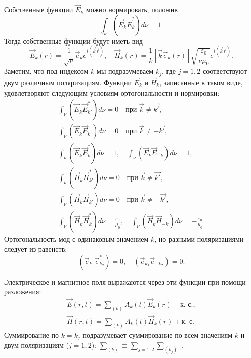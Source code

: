 Собственные функции $\vec{E}_k$ можно нормировать, положив
\begin{equation}
\int_{\nu} \left( \vec{E}_k \vec{E}_{k}^{*} \right) d \nu = 1.
\end{equation}
Тогда собственные функции будут иметь вид
\[
\vec{E}_k\left(r\right) = \frac{1}{\sqrt{\nu}}\vec{e}_k e^{i \left( \vec{k}\vec{r}\right)},
\quad
\vec{H}_k\left(r\right) = 
\frac{1}{k}
\left[\vec{k}\vec{e}_k\left(r\right)\right] 
\sqrt{\frac{\varepsilon_0}{\nu \mu_0}}
e^{i \left( \vec{k}\vec{r}\right)}.
\]
Заметим, что под индексом $k$  мы подразумеваем $k_j$,  где  $j = 1,
2$  соответствуют двум различным поляризациям.  
Функции  $\vec{E}_k$  и  $\vec{H}_k$,  записанные в таком виде,
удовлетворяют следующим условиям ортогональности и нормировки: 
\begin{eqnarray}
\int_{\nu} \left( \vec{E}_k \vec{E}_{k'}^{*} \right) d \nu = 0
\quad
\mbox{при } \vec{k} \ne \vec{k'},
\nonumber \\
\int_{\nu} \left( \vec{E}_k \vec{E}_{k'} \right) d \nu = 0
\quad
\mbox{при } \vec{k} \ne - \vec{k'},
\nonumber \\
\int_{\nu} \left( \vec{E}_k \vec{E}_{k}^{*} \right) d \nu = 1,
\quad
\int_{\nu} \left( \vec{E}_k \vec{E}_{-k} \right) d \nu = 1,
\nonumber \\
\int_{\nu} \left( \vec{H}_k \vec{H}_{k'}^{*} \right) d \nu = 0
\quad
\mbox{при } \vec{k} \ne \vec{k'},
\nonumber \\
\int_{\nu} \left( \vec{H}_k \vec{H}_{k'} \right) d \nu = 0
\quad
\mbox{при } \vec{k} \ne - \vec{k'},
\nonumber \\
\int_{\nu} \left( \vec{H}_k \vec{H}_{k}^{*} \right) d \nu = \frac{\varepsilon_0}{\mu_0},
\quad
\int_{\nu} \left( \vec{H}_k \vec{H}_{-k} \right) d \nu = - \frac{\varepsilon_0}{\mu_0}.
\label{eqCh1_task2}
\end{eqnarray}
Ортогональность мод с одинаковым значением $k$,  но разными
поляризациями следует из равенств:  
\[
\left(\vec{e}_{k_1} \vec{e}_{k_2}^{*}\right) = 0, \quad
\left(\vec{e}_{k_1} \vec{e}_{- k_2}\right) = 0.
\]

Электрическое и магнитное поля выражаются через эти функции при помощи разложения:
\begin{eqnarray}
\vec{E}\left(r, t\right) = 
\sum_{(k)} 
A_k\left(t\right) \vec{E}_k\left(r\right) +
\mbox{к. с.},
\nonumber \\
\vec{H}\left(r, t\right) = 
\sum_{(k)} 
A_k\left(t\right) \vec{H}_k\left(r\right) +
\mbox{к. с.}
\label{eqCh1_separation4six}
\end{eqnarray}
Суммирование по $k = k_j$ подразумевает суммирование по всем значениям
$k$ и двум поляризациям  ($j = 1,2$): 
$\sum_{(k)} \equiv \sum_{j = 1,2} \sum_{(k_j)}$ .
  
